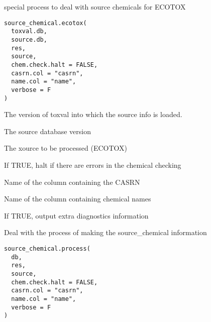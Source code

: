 \documentclass[letterpaper]{book}
\begin{document}
%
\begin{Description}\relax
special process to deal with source chemicals for ECOTOX
\end{Description}
%
\begin{Usage}
\begin{verbatim}
source_chemical.ecotox(
  toxval.db,
  source.db,
  res,
  source,
  chem.check.halt = FALSE,
  casrn.col = "casrn",
  name.col = "name",
  verbose = F
)
\end{verbatim}
\end{Usage}
%
\begin{Arguments}
\begin{ldescription}
\item[\code{toxval.db}] The version of toxval into which the source info is loaded.

\item[\code{source.db}] The source database version

\item[\code{source}] The xource to be processed (ECOTOX)

\item[\code{chem.check.halt}] If TRUE, halt if there are errors in the chemical checking

\item[\code{casrn.col}] Name of the column containing the CASRN

\item[\code{name.col}] Name of the column containing chemical names

\item[\code{verbose}] If TRUE, output extra diagnostics information
\end{ldescription}
\end{Arguments}
%
\begin{Description}\relax
Deal with the process of making the source\_chemical information
\end{Description}
%
\begin{Usage}
\begin{verbatim}
source_chemical.process(
  db,
  res,
  source,
  chem.check.halt = FALSE,
  casrn.col = "casrn",
  name.col = "name",
  verbose = F
)
\end{verbatim}
\end{Usage}
\end{document}
